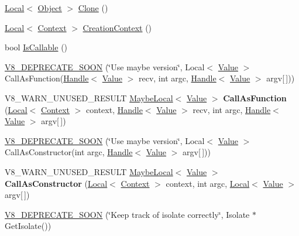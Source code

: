 \begin{DoxyCompactItemize}
\item 
\hyperlink{classv8_1_1_local}{Local}$<$ \hyperlink{classv8_1_1_object}{Object} $>$ \hyperlink{classv8_1_1_object_a5018c9d085aa71f65530cf1e073a04ad}{Clone} ()
\item 
\hyperlink{classv8_1_1_local}{Local}$<$ \hyperlink{classv8_1_1_context}{Context} $>$ \hyperlink{classv8_1_1_object_af6966283a7d7e20779961eed434db04d}{Creation\+Context} ()
\item 
bool \hyperlink{classv8_1_1_object_a23c2c1f23b50fab4a02e2f819641b865}{Is\+Callable} ()
\item 
\hyperlink{classv8_1_1_object_acc22c4a71aca62712841397e92d1b667}{V8\+\_\+\+D\+E\+P\+R\+E\+C\+A\+T\+E\+\_\+\+S\+O\+O\+N} (\char`\"{}Use maybe version\char`\"{}, Local$<$ \hyperlink{classv8_1_1_value}{Value} $>$ Call\+As\+Function(\hyperlink{classv8_1_1_local}{Handle}$<$ \hyperlink{classv8_1_1_value}{Value} $>$ recv, int argc, \hyperlink{classv8_1_1_local}{Handle}$<$ \hyperlink{classv8_1_1_value}{Value} $>$ argv\mbox{[}$\,$\mbox{]}))
\item 
\hypertarget{classv8_1_1_object_a08b9bd7cd3ada07bdd4cc0f1db0288f3}{}V8\+\_\+\+W\+A\+R\+N\+\_\+\+U\+N\+U\+S\+E\+D\+\_\+\+R\+E\+S\+U\+L\+T \hyperlink{classv8_1_1_maybe_local}{Maybe\+Local}$<$ \hyperlink{classv8_1_1_value}{Value} $>$ {\bfseries Call\+As\+Function} (\hyperlink{classv8_1_1_local}{Local}$<$ \hyperlink{classv8_1_1_context}{Context} $>$ context, \hyperlink{classv8_1_1_local}{Handle}$<$ \hyperlink{classv8_1_1_value}{Value} $>$ recv, int argc, \hyperlink{classv8_1_1_local}{Handle}$<$ \hyperlink{classv8_1_1_value}{Value} $>$ argv\mbox{[}$\,$\mbox{]})\label{classv8_1_1_object_a08b9bd7cd3ada07bdd4cc0f1db0288f3}

\item 
\hyperlink{classv8_1_1_object_a0e389ee595a569b9f5b4fb9051422f26}{V8\+\_\+\+D\+E\+P\+R\+E\+C\+A\+T\+E\+\_\+\+S\+O\+O\+N} (\char`\"{}Use maybe version\char`\"{}, Local$<$ \hyperlink{classv8_1_1_value}{Value} $>$ Call\+As\+Constructor(int argc, \hyperlink{classv8_1_1_local}{Handle}$<$ \hyperlink{classv8_1_1_value}{Value} $>$ argv\mbox{[}$\,$\mbox{]}))
\item 
\hypertarget{classv8_1_1_object_a10dcefb0bd595a959234703690a02530}{}V8\+\_\+\+W\+A\+R\+N\+\_\+\+U\+N\+U\+S\+E\+D\+\_\+\+R\+E\+S\+U\+L\+T \hyperlink{classv8_1_1_maybe_local}{Maybe\+Local}$<$ \hyperlink{classv8_1_1_value}{Value} $>$ {\bfseries Call\+As\+Constructor} (\hyperlink{classv8_1_1_local}{Local}$<$ \hyperlink{classv8_1_1_context}{Context} $>$ context, int argc, \hyperlink{classv8_1_1_local}{Local}$<$ \hyperlink{classv8_1_1_value}{Value} $>$ argv\mbox{[}$\,$\mbox{]})\label{classv8_1_1_object_a10dcefb0bd595a959234703690a02530}

\item 
\hyperlink{classv8_1_1_object_a5e7199a517d980396bb86f876b5bae0a}{V8\+\_\+\+D\+E\+P\+R\+E\+C\+A\+T\+E\+\_\+\+S\+O\+O\+N} (\char`\"{}Keep track of isolate correctly\char`\"{}, Isolate $\ast$Get\+Isolate())
\end{DoxyCompactItemize}

